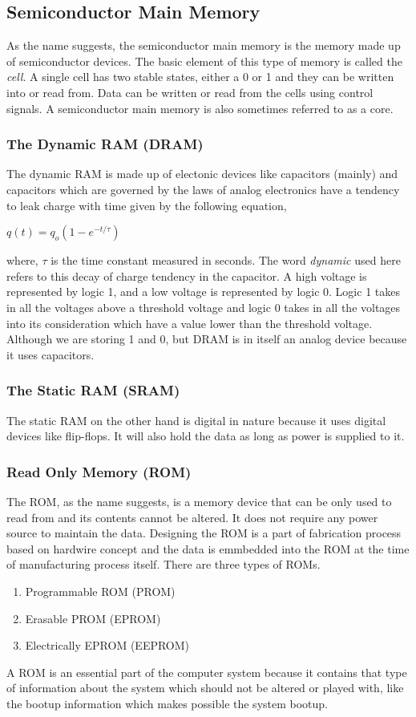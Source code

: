 \documentclass{article}
\begin{document}
\subsection{Semiconductor Main Memory}
As the name suggests, the semiconductor main memory is the memory made up of semiconductor devices. The basic element of this type of memory is called the \textit{cell}. A single cell has two stable states, either a 0 or 1 and they can be written into or read from. Data can be written or read from the cells using control signals. A semiconductor main memory is also sometimes referred to as a core.

\newpage
\subsubsection{The Dynamic RAM (DRAM)}
The dynamic RAM is made up of electonic devices like capacitors (mainly) and capacitors which are governed by the laws of analog electronics have a tendency to leak charge with time given by the following equation,
\begin{center}
$\displaystyle q(t) = q_{o}(1-e^{-t/\tau})$
\end{center}
where, $\tau$ is the time constant measured in seconds. The word \textit{dynamic} used here refers to this decay of charge tendency in the capacitor. A high voltage is represented by logic 1, and a low voltage is represented by logic 0. Logic 1 takes in all the voltages above a threshold voltage and logic 0 takes in all the voltages into its consideration which have a value lower than the threshold voltage. Although we are storing 1 and 0, but DRAM is in itself an analog device because it uses capacitors.

\subsubsection{The Static RAM (SRAM)}
The static RAM on the other hand is digital in nature because it uses digital devices like flip-flops. It will also hold the data as long as power is supplied to it.

\subsubsection{Read Only Memory (ROM)}
The ROM, as the name suggests, is a memory device that can be only used to read from and its contents cannot be altered. It does not require any power source to maintain the data. Designing the ROM is a part of fabrication process based on hardwire concept and the data is emmbedded into the ROM at the time of manufacturing process itself. There are three types of ROMs.
\begin{enumerate}
\item Programmable ROM (PROM)
\item Erasable PROM (EPROM)
\item Electrically EPROM (EEPROM)
\end{enumerate}
A ROM is an essential part of the computer system because it contains that type of information about the system which should not be altered or played with, like the bootup information which makes possible the system bootup.
\end{document}
